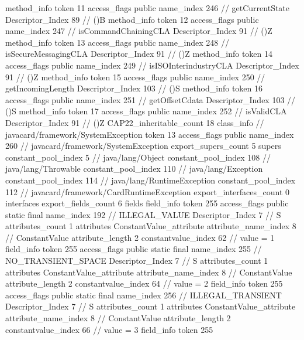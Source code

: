 {{{{{				}
				method_info {
					token	11
					access_flags	public
					name_index	246		// getCurrentState
					Descriptor_Index	89		// ()B
				}
				method_info {
					token	12
					access_flags	public
					name_index	247		// isCommandChainingCLA
					Descriptor_Index	91		// ()Z
				}
				method_info {
					token	13
					access_flags	public
					name_index	248		// isSecureMessagingCLA
					Descriptor_Index	91		// ()Z
				}
				method_info {
					token	14
					access_flags	public
					name_index	249		// isISOInterindustryCLA
					Descriptor_Index	91		// ()Z
				}
				method_info {
					token	15
					access_flags	public
					name_index	250		// getIncomingLength
					Descriptor_Index	103		// ()S
				}
				method_info {
					token	16
					access_flags	public
					name_index	251		// getOffsetCdata
					Descriptor_Index	103		// ()S
				}
				method_info {
					token	17
					access_flags	public
					name_index	252		// isValidCLA
					Descriptor_Index	91		// ()Z
				}
			}
			CAP22_inheritable_count	18
		}
		class_info {		// javacard/framework/SystemException
			token	13
			access_flags	public
			name_index	260		// javacard/framework/SystemException
			export_supers_count	5
			supers {
				constant_pool_index	5		// java/lang/Object
				constant_pool_index	108		// java/lang/Throwable
				constant_pool_index	110		// java/lang/Exception
				constant_pool_index	114		// java/lang/RuntimeException
				constant_pool_index	112		// javacard/framework/CardRuntimeException
			}
			export_interfaces_count	0
			interfaces {
			}
			export_fields_count	6
			fields {
			field_info {
				token	255
				access_flags	public static final
				name_index	192		// ILLEGAL_VALUE
				Descriptor_Index	7		// S
				attributes_count	1
				attributes {
				ConstantValue_attribute {
					attribute_name_index	8		// ConstantValue
					attribute_length	2
					constantvalue_index	62		// value = 1
				}
				}
			}
			field_info {
				token	255
				access_flags	public static final
				name_index	255		// NO_TRANSIENT_SPACE
				Descriptor_Index	7		// S
				attributes_count	1
				attributes {
				ConstantValue_attribute {
					attribute_name_index	8		// ConstantValue
					attribute_length	2
					constantvalue_index	64		// value = 2
				}
				}
			}
			field_info {
				token	255
				access_flags	public static final
				name_index	256		// ILLEGAL_TRANSIENT
				Descriptor_Index	7		// S
				attributes_count	1
				attributes {
				ConstantValue_attribute {
					attribute_name_index	8		// ConstantValue
					attribute_length	2
					constantvalue_index	66		// value = 3
				}
				}
			}
			field_info {
				token	255
}}}}}

